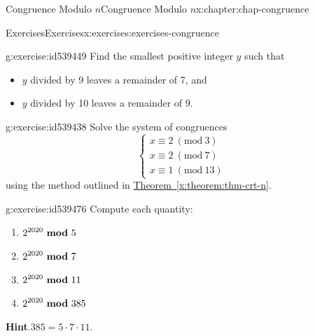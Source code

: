 \documentclass[oneside,10pt,]{book}
\newcommand{\blocktitlefont}{\relax}
\newcommand{\xreffont}{\relax}
\numberwithin{equation}{section}
\newcommand{\Mod}[1]{\ \left(\mathrm{mod}\ #1\right)}
\newcommand{\mmod}[1]{\ \mathrm{\bf mod}\ #1}
\begin{document}
\begin{chapterptx}{Congruence Modulo \(n\)}{}{Congruence Modulo \(n\)}{}{}{x:chapter:chap-congruence}
\begin{exercises-section}{Exercises}{}{Exercises}{}{}{x:exercises:exercises-congruence}
\begin{divisionexercise}{18}{}{}{g:exercise:id539449}%
Find the smallest positive integer \(y\) such that%
\begin{itemize}[label=\textbullet]
\item{}\(y\) divided by 9 leaves a remainder of 7, and%
\item{}\(y\) divided by 10 leaves a remainder of 9.%
\end{itemize}
%
\end{divisionexercise}%
\begin{divisionexercise}{19}{}{}{g:exercise:id539438}%
Solve the system of congruences%
\begin{equation*}
\begin{cases} x \equiv 2 \Mod{3} \\
x \equiv 2 \Mod{7} \\
x \equiv 1 \Mod{13} \end{cases}
\end{equation*}
using the method outlined in \hyperref[x:theorem:thm-crt-n]{Theorem~{\xreffont\ref{x:theorem:thm-crt-n}}}.%
\end{divisionexercise}%
\begin{divisionexercise}{20}{}{}{g:exercise:id539476}%
Compute each quantity:%
\begin{enumerate}[label=(\alph*)]
\item{}\(\displaystyle 2^{2020} \mmod{5}\)%
\item{}\(\displaystyle 2^{2020} \mmod{7}\)%
\item{}\(\displaystyle 2^{2020} \mmod{11}\)%
\item{}\(\displaystyle 2^{2020} \mmod{385}\)%
\end{enumerate}
%
\par\smallskip%
\noindent\textbf{\blocktitlefont Hint}.\hypertarget{g:hint:id539499}{}\quad{}\(385 = 5 \cdot 7 \cdot 11\).%
\end{divisionexercise}%
\end{exercises-section}
\end{chapterptx}
%
%
\typeout{************************************************}
\typeout{************************************************}
%
\end{document}
